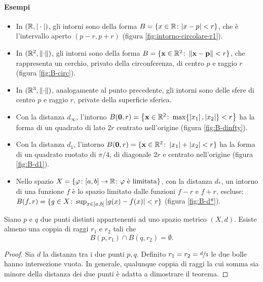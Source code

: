 \paragraph{Esempi}
\begin{itemize}
	\item In $(\mathbb{R},|\cdot|)$, gli intorni sono della forma $B=\{x\in\mathbb{R}\colon|x-p|<r\}$, che è l'intervallo aperto $(p-r,p+r)$ (figura \ref{fig:intorno-circolare-r1}).
		
	\item In $(\mathbb{R}^2,\left\|{\cdot}\right\|)$, gli intorni sono della forma $B=\{\mathbf{x}\in\mathbb{R}^2\colon\left\|{\mathbf{x}-\mathbf{p}}\right\|<r\}$, che rappresenta un cerchio, privato della circonferenza, di centro $p$ e raggio $r$ (figura \ref{fig:B-circ}).
		
\item In $(\mathbb{R}^3,\left\|{\cdot}\right\|)$, analogamente al punto precedente, gli intorni sono delle sfere di centro $p$ e raggio $r$, private della superficie sferica.
\item Con la distanza $d_\infty$, l'intorno $B(\mathbf{0},r)=\big\{\mathbf{x}\in\mathbb{R}^2\colon\max\{\left|{x_1}\right|,\left|{x_2}\right|\}<r\big\}$ ha la forma di un quadrato di lato $2r$ centrato nell'origine (figura \ref{fig:B-dinfty}).

\item Con la distanza $d_1$, l'intorno $B(\mathbf{0},r)=\{\mathbf{x}\in\mathbb{R}^2\colon\left|{x_1}\right|+\left|{x_2}\right|<r\}$ ha la forma di un quadrato ruotato di $\pi/4$, di diagonale $2r$ e centrato nell'origine (figura \ref{fig:B-d1}).

\item Nello spazio $X=\{\varphi\colon[a,b]\to\mathbb{R}\colon\varphi\text{ è limitata}\}$, con la distanza $d_*$, un intorno di una funzione $f$ è lo spazio limitato dalle funzioni $f-r$ e $f+r$, escluse: $B(f,r)=\{g\in X\colon\sup_{x\in[a,b]}\left|{g(x)-f(x)}\right|<r\}$ (figura \ref{fig:B-d*}).

\end{itemize}

\begin{teorema}
\label{t:hausdorff}
Siano $p$ e $q$ due punti distinti appartenenti ad uno spazio metrico $(X,d)$. Esiste almeno una coppia di raggi $r_1$ e $r_2$ tali che
\[
B(p,r_1)\cap B(q,r_2)=\emptyset.
\]
\end{teorema}
\begin{proof}
Sia $d$ la distanza tra i due punti $p,q$. Definito $r_1=r_2=\sfrac{d}{3}$ le due bolle hanno intersezione vuota. In generale, qualunque coppia di raggi la cui somma sia minore della distanza dei due punti è adatta a dimostrare il teorema.
\end{proof}

